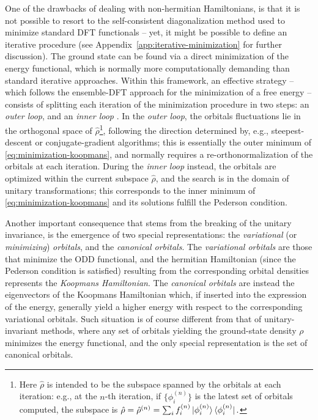 One of the drawbacks of dealing with non-hermitian Hamiltonians, is that it is not possible to resort to the self-consistent diagonalization method used to minimize standard DFT functionals -- yet, it might be possible to define an iterative procedure (see Appendix~\ref{app:iterative-minimization} for further discussion). The ground state can be found via a direct minimization of the energy functional, which is normally more computationally demanding than standard iterative approaches. Within this framework, an effective strategy -- which follows the ensemble-DFT approach for the minimization of a free energy \cite{marzari_ensemble_1997} -- consists of splitting each iteration of the minimization procedure in two steps: an \emph{outer loop}, and an \emph{inner loop} \cite{borghi_variational_2015,stengel_self-interaction_2008,klupfel_optimization_2012}. In the \emph{outer loop}, the orbitals fluctuations lie in the orthogonal space of $\hat{\rho}$\footnote{Here $\hat{\rho}$ is intended to be the subspace spanned by the orbitals at each iteration: e.g., at the $n$-th iteration, if $\{ \phi_i^{(n)} \}$ is the latest set of orbitals computed, the subspace is $\hat{\rho} = \hat{\rho}^{(n)} = \sum_i f_i^{(n)} \ket{\phi_i^{(n)}}\bra{\phi_i^{(n)}}.$}, following the direction determined by, e.g., steepest-descent or conjugate-gradient algorithms; this is essentially the outer minimum of \cref{eq:minimization-koopmans}, and normally requires a re-orthonormalization of the orbitals at each iteration. During the \emph{inner loop} instead, the orbitals are optimized within the current subspace $\hat{\rho}$, and the search is in the domain of unitary transformations; this corresponds to the inner minimum of \cref{eq:minimization-koopmans} and its solutions fulfill the Pederson condition.

Another important consequence that stems from the breaking of the unitary invariance, is the emergence of two special representations: the \emph{variational} (or \emph{minimizing}) \emph{orbitals}, and the \emph{canonical orbitals}. The \emph{variational orbitals} are those that minimize the ODD functional, and the hermitian Hamiltonian (since the Pederson condition is satisfied) resulting from the corresponding orbital densities represents the \emph{Koopmans Hamiltonian}. The \emph{canonical orbitals} are instead the eigenvectors of the Koopmans Hamiltonian which, if inserted into the expression of the energy, generally yield a higher energy with respect to the corresponding variational orbitals. Such situation is of course different from that of unitary-invariant methods, where any set of orbitals yielding the ground-state density $\rho$ minimizes the energy functional, and the only special representation is the set of canonical orbitals.

